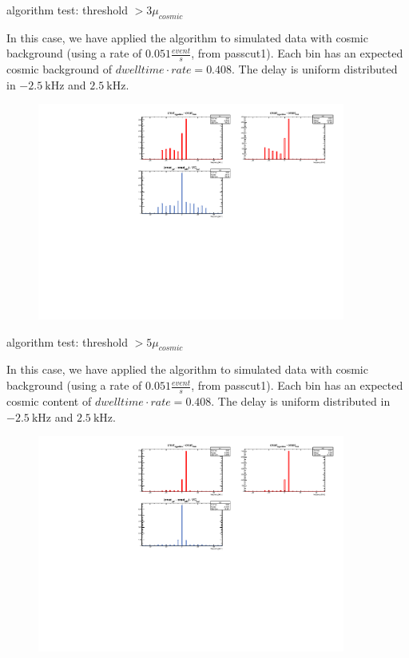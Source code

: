 \documentclass[9pt]{beamer}
\begin{document}
\begin{frame}{algorithm test: threshold $ > 3 \mu_{cosmic}$}

In this case, we have applied the algorithm to simulated data with cosmic background (using a rate of $0.051 \frac{event}{s}$, from passcut1). Each bin has an expected cosmic background of $dwelltime \cdot rate = 0.408$.
The delay is uniform distributed in $\SI{-2.5}{\kilo \hertz}$ and $\SI{+2.5}{\kilo \hertz}$. 
\begin{figure}
\includegraphics[width = 0.9\textwidth]{../Plot/OnsetResult11.pdf}
\end{figure}
\end{frame}

\begin{frame}{algorithm test: threshold $ > 5 \mu_{cosmic}$}

In this case, we have applied the algorithm to simulated data with cosmic background (using a rate of $0.051 \frac{event}{s}$, from passcut1). Each bin has an expected cosmic content of $dwelltime \cdot rate = 0.408$.
The delay is uniform distributed in $\SI{-2.5}{\kilo \hertz}$ and $\SI{+2.5}{\kilo \hertz}$. 
\begin{figure}
\includegraphics[width = 0.9\textwidth]{../Plot/OnsetResult12.pdf}
\end{figure}

\end{frame}
\end{document}

